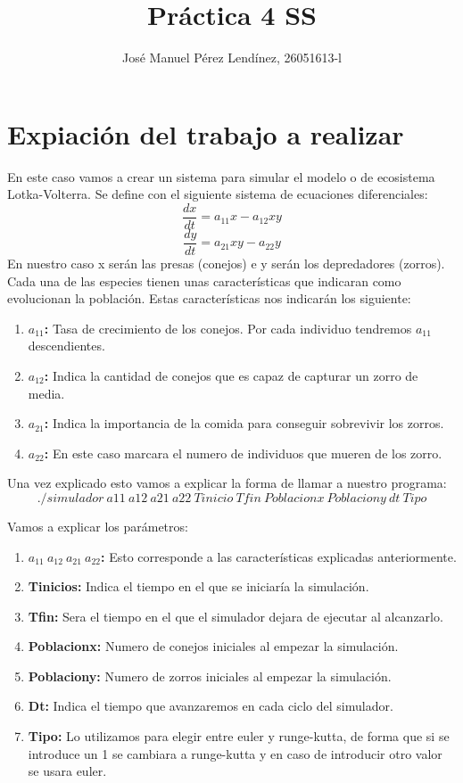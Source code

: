 \documentclass[]{article}
\title{Práctica 4 SS}
\author{José Manuel Pérez Lendínez, 26051613-l}
\begin{document}
	\maketitle
	
	
	\newpage
	\tableofcontents
	\newpage

\section{Expiación del trabajo a realizar}
En este caso vamos a crear un sistema para simular el modelo o de ecosistema Lotka-Volterra. Se define con el siguiente sistema de ecuaciones diferenciales:
$$\frac{d x}{d t}=a_{11} x-a_{12} x y$$
$$\frac{d y}{d t}=a_{21} x y-a_{22} y$$
En nuestro caso x serán las presas (conejos) e y serán los depredadores (zorros). Cada una de las especies tienen unas características que indicaran como evolucionan la población. Estas características nos indicarán los siguiente:
\begin{enumerate}
	\item \textbf{$a_{11}$:} Tasa de crecimiento de los conejos. Por cada individuo tendremos $a_{11}$ descendientes.
	\item \textbf{$a_{12}$:} Indica la cantidad de conejos que es capaz de capturar un zorro de media.
	\item \textbf{$a_{21}$:} Indica la importancia de la comida para conseguir sobrevivir los zorros.
	\item \textbf{$a_{22}$:} En este caso marcara el numero de individuos que mueren de los zorro. 
\end{enumerate}

Una vez explicado esto vamos a explicar la forma de llamar a nuestro programa:
$$ ./simulador\ a11\ a12\ a21\ a22\ Tinicio\ Tfin\ Poblacionx\ Poblaciony\ dt\ Tipo$$

Vamos a explicar los parámetros:
\begin{enumerate}
	\item \textbf{$a_{11}\ a_{12}\ a_{21}\ a_{22}$:} Esto corresponde a las características explicadas anteriormente.
	\item \textbf{Tinicios:} Indica el tiempo en el que se iniciaría la simulación.
	\item \textbf{Tfin:} Sera el tiempo en el que el simulador dejara de ejecutar al alcanzarlo.
	\item \textbf{Poblacionx:} Numero de conejos iniciales al empezar la simulación.
	\item \textbf{Poblaciony:} Numero de zorros iniciales al empezar la simulación.
	\item \textbf{Dt:} Indica el tiempo que avanzaremos en cada ciclo del simulador.
	\item \textbf{Tipo:} Lo utilizamos para elegir entre euler y runge-kutta, de forma que si se introduce un 1 se cambiara a runge-kutta y en caso de introducir otro valor se usara euler. 
\end{enumerate}
\end{document}
